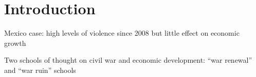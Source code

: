 \section{Introduction}
\label{intro}

Mexico case: high levels of violence since 2008 but little effect on economic growth

Two schools of thought on civil war and economic development: ``war renewal'' and ``war ruin'' schools

